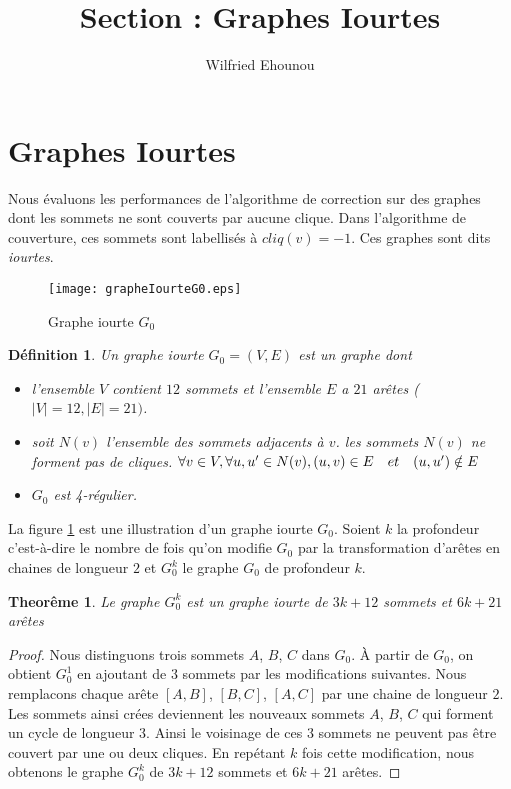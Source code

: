 \documentclass[onecolumn, 12pt]{book}
\title{Section : Graphes Iourtes}
\author{Wilfried Ehounou}
\date{\oldstylenums{\today}}
\newtheorem{definition}{D\'efinition}
\newtheorem{theorem}{Theor\^eme}
\begin{document}
\maketitle
\tableofcontents

\section{Graphes Iourtes}
Nous \'evaluons les performances de l'algorithme de correction sur des graphes dont les sommets ne sont couverts par aucune clique. Dans l'algorithme de couverture, ces sommets sont labellis\'es \`a $cliq(v) = -1$. Ces graphes sont dits {\em iourtes}.

\begin{figure}[htb!] 
\centering
\texttt{[image: grapheIourteG0.eps]}
\caption{Graphe iourte $G_0 $}
\label{grapheIourteG0} 
\end{figure}

\begin{definition}
Un graphe iourte $G_0 = (V, E)$ est un graphe dont
\begin{itemize}
	\item l'ensemble $V$ contient $12$ sommets et l'ensemble $E$ a $21$ ar\^etes ($|V| = 12, |E| = 21)$.
	\item soit $N(v)$ l'ensemble des sommets adjacents \`a $v$. 
		les sommets $N(v)$ ne forment pas de cliques. \newline
		$\forall v \in V, \forall u, u' \in N(v),  (u, v) \in E \hspace{1 em} et  \hspace{1 em} (u, u') \notin E $
	\item $G_0$ est {\em 4-r\'egulier}.
\end{itemize}
\end{definition}
La figure \ref{grapheIourteG0} est une illustration d'un graphe iourte $G_0$.
\newline
Soient $k$ la profondeur c'est-\`a-dire le nombre de fois qu'on modifie $G_0$ par la transformation d'ar\^etes en chaines de longueur $2$ et $G_0^k$ le graphe $G_0$ de profondeur $k$.

\begin{theorem}
Le graphe $G_0^k$ est un graphe iourte de $3k+12$ sommets et $6k + 21$ ar\^etes
\end{theorem} 

\begin{proof}
Nous distinguons trois sommets $A$, $B$, $C$ dans $G_0$. 
\`A partir de $G_0$, on obtient $G_0^1$ en ajoutant de $3$ sommets par les modifications  suivantes.
Nous remplacons chaque ar\^ete $[A,B]$, $[B,C]$,  $[A,C]$  par une chaine de longueur $2$. 
Les sommets ainsi cr\'ees deviennent les nouveaux sommets   $A$, $B$, $C$ qui forment un cycle de longueur $3$.
Ainsi le voisinage de ces $3$ sommets  ne peuvent pas \^etre couvert par une ou deux cliques.
En rep\'etant $k$ fois cette modification, nous obtenons le graphe $G_0^k$ de $3k+12$ sommets et $6k+21$ ar\^etes.
\end{proof}
\end{document}
